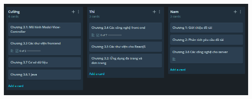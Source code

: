 \documentclass[a4paper]{article}
\begin{document}
\newpage
\tableofcontents
\newpage
\listoffigures
\newpage
\listoftables
\newpage

\includegraphics[width=150mm]{img/glo.png}






\end{document}
